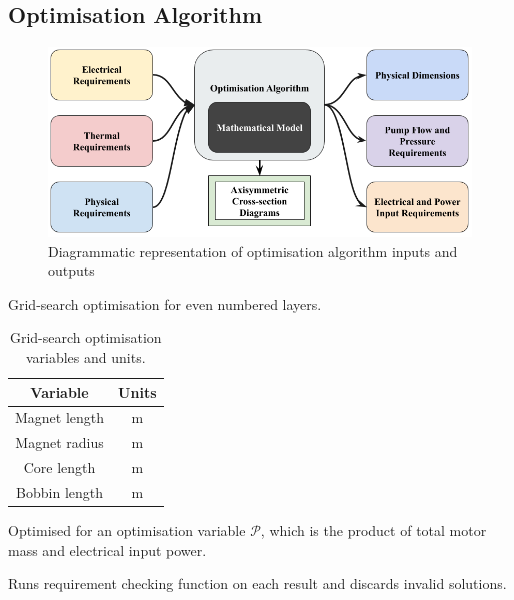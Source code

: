 \documentclass[a4paper,12pt]{article}
\begin{document}
\subsection{Optimisation Algorithm}
\begin{figure}[h!] 
	\centering
	\includegraphics[scale=0.4]{optiAlgro.png}
	\caption{Diagrammatic representation of optimisation algorithm inputs and outputs}
	\label{fg:optiAlgo}
\end{figure}

Grid-search optimisation for even numbered layers.

\begin{table} [h!] 
	\centering
	\caption{Grid-search optimisation variables and units.}
	\label{tb:gridsearch}
	\begin{tabular}{c | c} 
		\textbf{Variable} & \textbf{Units} \\ [0.5ex] 
		\hline\hline
		Magnet length & m \\
		\hline
		Magnet radius & m \\
		\hline
		Core length & m \\ 
		\hline
		Bobbin length & m \\
	\end{tabular}
\end{table}

Optimised for an optimisation variable $\mathcal{P}$, which is the product of total motor mass and electrical input power.

Runs requirement checking function on each result and discards invalid solutions.
\end{document}

